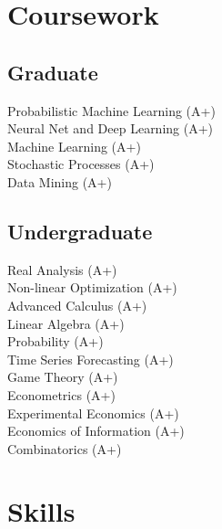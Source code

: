 \documentclass[letterpaper]{deedy-resume} %
\begin{document}
\begin{minipage}[t]{0.33\textwidth}
\sectionspace %


\section{Coursework}

\subsection{Graduate}

Probabilistic Machine Learning (A+) \\
Neural Net and Deep Learning (A+) \\
Machine Learning (A+) \\
Stochastic Processes (A+) \\
Data Mining (A+) \\

\sectionspace %


\subsection{Undergraduate}

Real Analysis (A+) \\
Non-linear Optimization (A+) \\
Advanced Calculus (A+) \\
Linear Algebra (A+) \\
Probability (A+) \\
Time Series Forecasting (A+) \\
Game Theory (A+) \\
Econometrics (A+) \\
Experimental Economics (A+) \\
Economics of Information (A+) \\
Combinatorics (A+)

\sectionspace %


\section{Skills}


\end{minipage}
\end{document}

